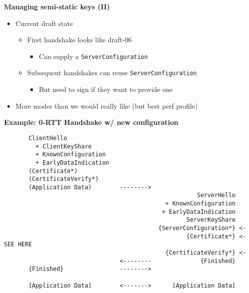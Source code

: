 \documentclass[helvetica]{seminar}
\newcommand{\heading}[1]{%
  \begin{center} 
    \large\bf 
    #1 
  \end{center} 
  \vspace{.4 in}}
\begin{document}
\begin{slide}
\heading{Managing semi-static keys (II)}
\begin{itemize}
\item Current draft state
  \begin{itemize}
  \item First handshake looks like draft-06
    \begin{itemize}
    \item Can supply a \verb^ServerConfiguration^
    \end{itemize}

  \item Subsequent handshakes can reuse \verb^ServerConfiguration^
    \begin{itemize}
      \item But need to sign if they want to provide one
    \end{itemize}
  \end{itemize}
\item More modes than we would really like (but best perf profile)
\end{itemize}
\end{slide}


\begin{slide}
\heading{Example: 0-RTT Handshake w/ new configuration}

\vspace{-4ex}
\begin{footnotesize}
\begin{verbatim}
       ClientHello
         + ClientKeyShare
         + KnownConfiguration
         + EarlyDataIndication
       (Certificate*)
       (CertificateVerify*)
       (Application Data)        -------->
                                                       ServerHello
                                              + KnownConfiguration
                                             + EarlyDataIndication
                                                    ServerKeyShare
                                            {ServerConfiguration*} <- 
                                                    {Certificate*} <- SEE HERE
                                              {CertificateVerify*} <-
                                 <--------              {Finished}
       {Finished}                -------->

       [Application Data]        <------->      [Application Data]
\end{verbatim}
\end{footnotesize}
\end{slide}
\end{document}
